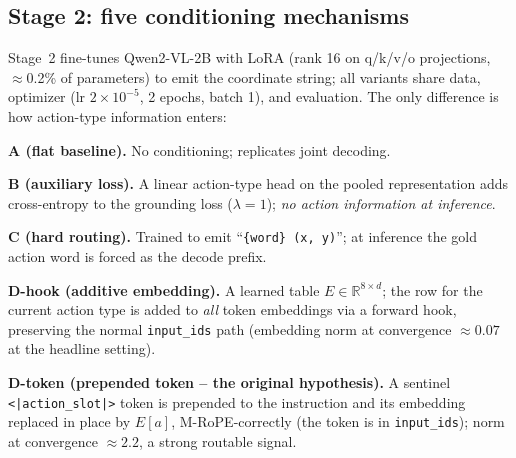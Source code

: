 \subsection{Stage 2: five conditioning mechanisms}

Stage~2 fine-tunes Qwen2-VL-2B with LoRA (rank 16 on q/k/v/o projections,
$\approx$0.2\% of parameters) to emit the coordinate string; all variants
share data, optimizer (lr $2\times10^{-5}$, 2 epochs, batch 1), and
evaluation. The only difference is how action-type information enters:

\textbf{A (flat baseline).} No conditioning; replicates joint decoding.

\textbf{B (auxiliary loss).} A linear action-type head on the pooled
representation adds cross-entropy to the grounding loss
($\lambda{=}1$); \emph{no action information at inference}.

\textbf{C (hard routing).} Trained to emit ``\texttt{\{word\} (x, y)}'';
at inference the gold action word is forced as the decode prefix.

\textbf{D-hook (additive embedding).} A learned table
$E\in\mathbb{R}^{8\times d}$; the row for the current action type is added
to \emph{all} token embeddings via a forward hook, preserving the normal
\texttt{input\_ids} path (embedding norm at convergence $\approx0.07$ at
the headline setting).

\textbf{D-token (prepended token -- the original hypothesis).} A sentinel
\texttt{<|action\_slot|>} token is prepended to the instruction and its
embedding replaced in place by $E[a]$, M-RoPE-correctly (the token is in
\texttt{input\_ids}); norm at convergence $\approx2.2$, a strong routable
signal.

